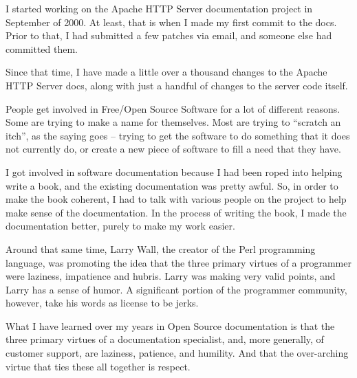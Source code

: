 



\noindent{}I started working on the Apache HTTP Server documentation project in September
of 2000. At least, that is when I made my first commit to the docs. Prior to
that, I had submitted a few patches via email, and someone else had committed
them.

Since that time, I have made a little over a thousand changes to the Apache HTTP
Server docs, along with just a handful of changes to the server code itself.

People get involved in Free/Open Source Software for a lot of different reasons.
Some are trying to make a name for themselves. Most are trying to ``scratch an
itch'', as the saying goes -- trying to get the software to do something that it
does not currently do, or create a new piece of software to fill a need that
they have.

I got involved in software documentation because I had been roped into helping
write a book, and the existing documentation was pretty awful. So, in order to
make the book coherent, I had to talk with various people on the project to help
make sense of the documentation. In the process of writing the book, I made the
documentation better, purely to make my work easier.

Around that same time, Larry Wall, the creator of the Perl programming language,
was promoting the idea that the three primary virtues of a programmer were
laziness, impatience and hubris. Larry was making very valid points, and Larry
has a sense of humor. A significant portion of the programmer community,
however, take his words as license to be jerks.

What I have learned over my years in Open Source documentation is that the three
primary virtues of a documentation specialist, and, more generally, of customer
support, are laziness, patience, and humility. And that the over-arching virtue
that ties these all together is respect.

